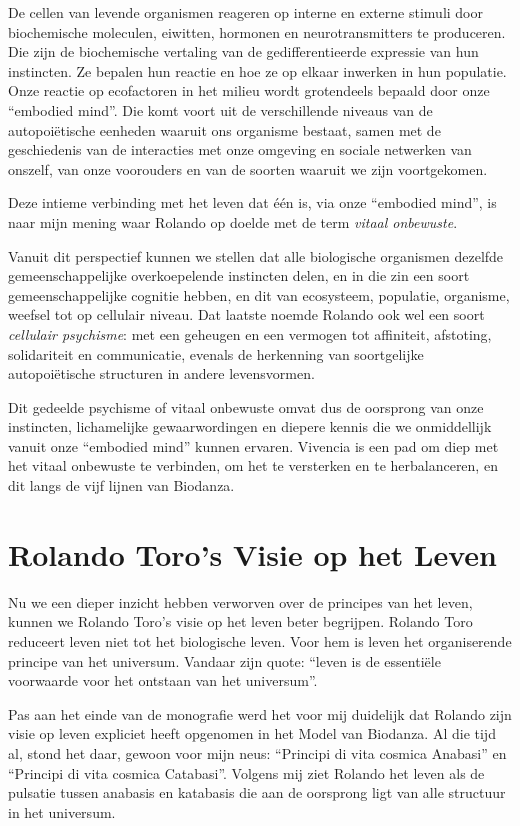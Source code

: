 \documentclass[
  11pt,
]{book}
\begin{document}
De cellen van levende organismen reageren op interne en externe stimuli door biochemische moleculen, eiwitten, hormonen en neurotransmitters te produceren. Die zijn de biochemische vertaling van de gedifferentieerde expressie van hun instincten. Ze bepalen hun reactie en hoe ze op elkaar inwerken in hun populatie. Onze reactie op ecofactoren in het milieu wordt grotendeels bepaald door onze ``embodied mind''. Die komt voort uit de verschillende niveaus van de autopoiëtische eenheden waaruit ons organisme bestaat, samen met de geschiedenis van de interacties met onze omgeving en sociale netwerken van onszelf, van onze voorouders en van de soorten waaruit we zijn voortgekomen.

Deze intieme verbinding met het leven dat één is, via onze ``embodied mind'', is naar mijn mening waar Rolando op doelde met de term \emph{vitaal onbewuste}.

Vanuit dit perspectief kunnen we stellen dat alle biologische organismen dezelfde gemeenschappelijke overkoepelende instincten delen, en in die zin een soort gemeenschappelijke cognitie hebben, en dit van ecosysteem, populatie, organisme, weefsel tot op cellulair niveau. Dat laatste noemde Rolando ook wel een soort \emph{cellulair psychisme}: met een geheugen en een vermogen tot affiniteit, afstoting, solidariteit en communicatie, evenals de herkenning van soortgelijke autopoiëtische structuren in andere levensvormen.

Dit gedeelde psychisme of vitaal onbewuste omvat dus de oorsprong van onze instincten, lichamelijke gewaarwordingen en diepere kennis die we onmiddellijk vanuit onze ``embodied mind'' kunnen ervaren. Vivencia is een pad om diep met het vitaal onbewuste te verbinden, om het te versterken en te herbalanceren, en dit langs de vijf lijnen van Biodanza.

\section{Rolando Toro's Visie op het Leven}\label{rolando-toros-visie-op-het-leven}

Nu we een dieper inzicht hebben verworven over de principes van het leven, kunnen we Rolando Toro's visie op het leven beter begrijpen.
Rolando Toro reduceert leven niet tot het biologische leven.
Voor hem is leven het organiserende principe van het universum.
Vandaar zijn quote: ``leven is de essentiële voorwaarde voor het ontstaan van het universum''.

Pas aan het einde van de monografie werd het voor mij duidelijk dat Rolando zijn visie op leven expliciet heeft opgenomen in het Model van Biodanza. Al die tijd al, stond het daar, gewoon voor mijn neus: ``Principi di vita cosmica Anabasi'' en ``Principi di vita cosmica Catabasi''.
Volgens mij ziet Rolando het leven als de pulsatie tussen anabasis en katabasis die aan de oorsprong ligt van alle structuur in het universum.
\end{document}
